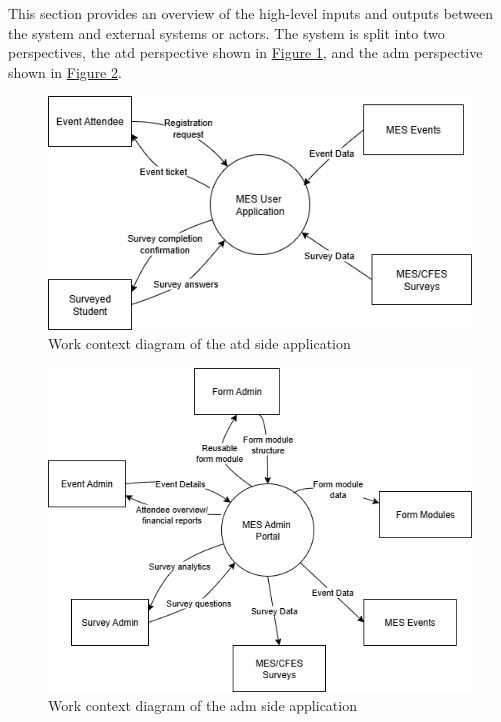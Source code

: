 \documentclass[12pt]{article}
\begin{document}
This section provides an overview of the high-level inputs and outputs between the system and external systems or
actors.
The system is split into two perspectives, the \gls{atd} perspective shown in \hyperref[fig:workcontextuser]{Figure
\ref{fig:workcontextuser}}, and the \gls{adm} perspective shown in \hyperref[fig:workcontextadmin]{Figure
\ref{fig:workcontextadmin}}.

\begin{center}
\begin{figure}[H]
    \centering
    \includegraphics[width=1\linewidth]{images/work_context_user.png}
    \caption{Work context diagram of the \gls{atd} side application}\label{fig:workcontextuser}
\end{figure}
\end{center}

\begin{center}
\begin{figure}[H]
    \centering
    \includegraphics[width=1\linewidth]{images/work_context_admin.png}
    \caption{Work context diagram of the \gls{adm} side application}\label{fig:workcontextadmin}
\end{figure}
\end{center}
\end{document}
